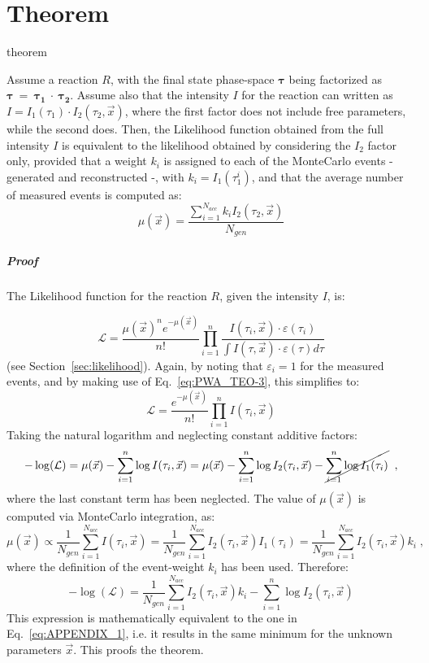 \documentclass[a4paper,10pt]{report}
\newcommand{\printteolike}{
Assume a reaction $R$, with the final state phase-space $\mathbf{\tau}$ being factorized as $\mathbf{\tau}~=~\mathbf{\tau_1}~\cdot~\mathbf{\tau_2}$.
Assume also that the intensity $I$ for the reaction can written as $I=I_1(\tau_1) \cdot I_2(\tau_2,\vec{x})$,
where the first factor does not include free parameters, while the second does. Then, the Likelihood function obtained from the full intensity $I$ is equivalent to the
likelihood obtained by considering the $I_2$ factor only, provided that a weight $k_i$ is assigned to each of the MonteCarlo events -generated and reconstructed -, with $k_i=I_1(\tau^i_1)$, and that the average number of measured events is computed as:
\begin{equation}
\mu(\vec{x})=\frac{\sum_{i=1}^{N_{acc}}k_iI_2(\tau_2,\vec{x})}{N_{gen}}
\end{equation}
}
\begin{document}
\appendix 
\chapter{Theorem}\label{app:theo}

\begin{reptheorem}{theorem}
\printteolike
\end{reptheorem}

\paragraph{Proof}

The Likelihood function for the reaction $R$, given the intensity $I$, is:

\begin{equation}\label{eq:APPENDIX_1}
\mathcal{L} = \frac{{\mu(\vec{x})}^n e^{-\mu(\vec{x})}}{n!} \prod_{i=1}^{n}\frac{ I(\tau_i,\vec{x}) \cdot \varepsilon(\tau_i) } {\int I(\tau,\vec{x}) \cdot \varepsilon(\tau) d\tau}
\end{equation}
(see Section~\ref{sec:likelihood}). Again, by noting that $\varepsilon_i=1$ for the measured events, and by making use of Eq.~\ref{eq:PWA_TEO-3}, this simplifies to:
\begin{equation}
\mathcal{L} = \frac{e^{-\mu(\vec{x})}}{n!} \prod_{i=1}^{n}I(\tau_i,\vec{x}) 
\end{equation}
Taking the natural logarithm and neglecting constant additive factors:
\begin{equation}
-\log(\mathcal{L}) = \mu(\vec{x}) - \sum_{i=1}^n \log I(\tau_i,\vec{x}) = \mu(\vec{x}) - \sum_{i=1}^n \log I_2(\tau_i,\vec{x})  - \cancel{\sum_{i=1}^n \log I_1(\tau_i)} \; \; ,
\end{equation}
where the last constant term has been neglected.
The value of $\mu(\vec{x})$ is computed via MonteCarlo integration, as:
\begin{equation}
\mu(\vec{x}) \propto \frac{1}{N_{gen}} \sum_{i=1}^{N_{acc}} I(\tau_i,\vec{x}) = \frac{1}{N_{gen}}\sum_{i=1}^{N_{acc}} I_2(\tau_i,\vec{x}) I_1(\tau_i) =  \frac{1}{N_{gen}}\sum_{i=1}^{N_{acc}} I_2(\tau_i,\vec{x}) k_i \; ,
\end{equation}
where the definition of the event-weight $k_i$ has been used.
Therefore:
\begin{equation}
-\log(\mathcal{L}) = \frac{1}{N_{gen}}\sum_{i=1}^{N_{acc}} I_2(\tau_i,\vec{x}) k_i - \sum_{i=1}^n \log I_2(\tau_i,\vec{x})
\end{equation}
This expression is mathematically equivalent to the one in Eq.~\ref{eq:APPENDIX_1}, i.e. it results in the same minimum for the unknown parameters $\vec{x}$. This proofs the theorem.
\end{document}
